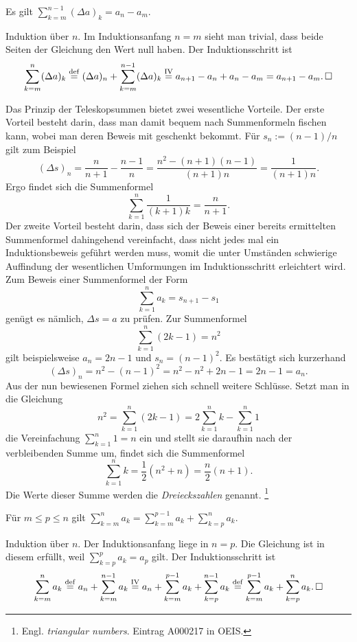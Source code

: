\begin{Satz}[Teleskopsumme]
Es gilt $\sum_{k=m}^{n-1} (\Delta a)_k = a_n - a_m$.
\end{Satz}
\begin{Beweis}
Induktion über $n$. Im Induktionsanfang $n=m$ sieht man trivial,
dass beide Seiten der Gleichung den Wert null haben. Der
Induktionsschritt ist%
\[\sum\limits_{k=m}^n (\Delta a)_k \stackrel{\mathrm{def}}=
(\Delta a)_n + \sum\limits_{k=m}^{n-1} (\Delta a)_k
\stackrel{\mathrm{IV}}= a_{n+1} - a_n + a_n - a_m = a_{n+1} - a_m.\,\Box\]
\end{Beweis}

\noindent
Das Prinzip der Teleskopsummen bietet zwei wesentliche Vorteile. 
Der erste Vorteil besteht darin, dass man damit bequem nach
Summenformeln fischen kann, wobei man deren Beweis mit geschenkt
bekommt. Für $s_n := (n-1)/n$ gilt zum Beispiel%
\[(\Delta s)_n = \frac{n}{n+1} - \frac{n-1}{n}
= \frac{n^2 - (n+1)(n-1)}{(n+1)n} = \frac{1}{(n+1)n}.\]
Ergo findet sich die Summenformel
\[\sum_{k=1}^n \frac{1}{(k+1)k} = \frac{n}{n+1}.\]
Der zweite Vorteil besteht darin, dass sich der Beweis einer bereits
ermittelten Summenformel dahingehend vereinfacht, dass nicht jedes
mal ein Induktionsbeweis geführt werden muss, womit die unter Umständen
schwierige Auffindung der wesentlichen Umformungen im Induktionsschritt
erleichtert wird. Zum Beweis einer Summenformel der Form%
\[\textstyle\sum_{k=1}^n a_k = s_{n+1} - s_1\]
genügt es nämlich, $\Delta s = a$ zu prüfen. Zur Summenformel%
\[\textstyle\sum_{k=1}^n (2k-1) = n^2\]
gilt beispielsweise $a_n = 2n-1$ und $s_n = (n-1)^2$. Es bestätigt sich
kurzerhand%
\[(\Delta s)_n = n^2 - (n-1)^2 = n^2 - n^2 + 2n - 1  = 2n-1 = a_n.\]
Aus der nun bewiesenen Formel ziehen sich schnell weitere Schlüsse.
Setzt man in die Gleichung%
\[\textstyle n^2 = \sum_{k=1}^n (2k-1) = 2\sum_{k=1}^n k - \sum_{k=1}^n 1\]
die Vereinfachung $\sum_{k=1}^n 1 = n$ ein und stellt sie daraufhin nach
der verbleibenden Summe um, findet sich die Summenformel%
\[\sum_{k=1}^n k = \frac{1}{2}(n^2 + n) = \frac{n}{2}(n+1).\]
Die Werte dieser Summe werden die \emph{Dreieckszahlen} genannt.%
\footnote{Engl. \emph{triangular numbers}. Eintrag A000217 in OEIS.}

\begin{Satz}%
\label{Summe-Aufteilung}\newlinefirst
Für $m\le p\le n$ gilt
$\sum_{k=m}^n a_k = \sum_{k=m}^{p-1} a_k+\sum_{k=p}^n a_k$.
\end{Satz}
\begin{Beweis}
Induktion über $n$. Der Induktionsanfang liege in $n=p$. Die Gleichung
ist in diesem erfüllt, weil $\sum_{k=p}^p a_k=a_p$ gilt.
Der Induktionsschritt ist%
\[\sum\limits_{k=m}^n a_k \stackrel{\mathrm{def}}= a_n+\sum\limits_{k=m}^{n-1} a_k
\stackrel{\mathrm{IV}}= a_n + \sum\limits_{k=m}^{p-1} a_k + \sum\limits_{k=p}^{n-1} a_k
\stackrel{\mathrm{def}}= \sum\limits_{k=m}^{p-1} a_k + \sum\limits_{k=p}^n a_k.\,\Box\]
\end{Beweis}

